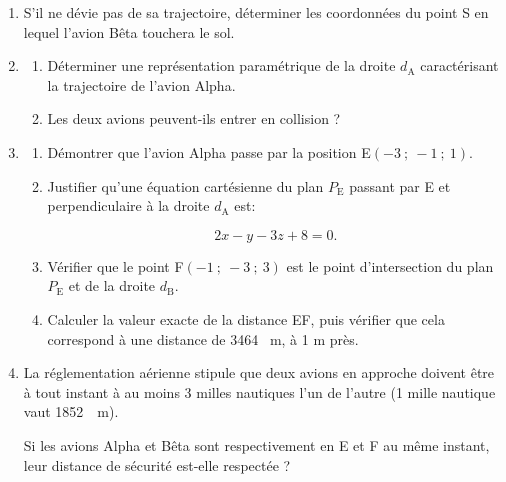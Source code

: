 \documentclass[10pt]{article}
\providecommand{\np}[2][]{{#2~#1}}
\begin{document}
\medskip

\begin{enumerate}
\item S'il ne dévie pas de sa trajectoire, déterminer les coordonnées du point S en lequel l'avion Bêta touchera le sol.
\item 
	\begin{enumerate}
		\item Déterminer une représentation paramétrique de la droite $d_{\text{A}}$ caractérisant la trajectoire de l'avion Alpha.
		\item Les deux avions peuvent-ils entrer en collision ?
	\end{enumerate}
\item 
	\begin{enumerate}
		\item Démontrer que l'avion Alpha passe par la position E$(-3~;~-1~;~1)$.
		\item Justifier qu'une équation cartésienne du plan $P_{\text{E}}$ passant par E et perpendiculaire à la droite $d_{\text{A}}$ est:

\[2x - y - 3z + 8 = 0.\]
		\item Vérifier que le point F$(-1~;~-3~;~3)$ est le point d'intersection du plan $P_{\text{E}}$ et de la droite $d_{\text{B}}$.
		\item Calculer la valeur exacte de la distance EF, puis vérifier que cela correspond à une distance de \np{3464} m, à 1 m près.
	\end{enumerate}
\item La réglementation aérienne stipule que deux avions en approche doivent être à tout instant à au moins 3 milles nautiques l'un de l'autre (1 mille nautique vaut \np{1852}~m).

Si les avions Alpha et Bêta sont respectivement en E et F au même instant, leur distance de sécurité est-elle respectée ?
\end{enumerate}

\bigskip
\end{document}
